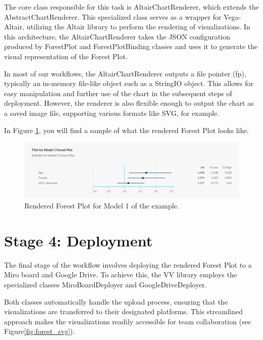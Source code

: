 The core class responsible for this task is AltairChartRenderer, which
extends the AbstractChartRenderer. This specialized class serves as a
wrapper for Vega-Altair, utilizing the Altair library to perform the
rendering of visualizations. In this architecture, the
AltairChartRenderer takes the JSON configuration produced by ForestPlot
and ForestPlotBinding classes and uses it to generate the visual
representation of the Forest Plot.

In most of our workflows, the AltairChartRenderer outputs a file pointer
(fp), typically an in-memory file-like object such as a StringIO object.
This allows for easy manipulation and further use of the chart in the
subsequent steps of deployment. However, the renderer is also flexible
enough to output the chart as a saved image file, supporting various
formats like SVG, for example.

In Figure \ref{fig:forest}, you will find a sample of what the rendered Forest Plot
looks like.

\begin{figure}[ht]
  \centering
  \includegraphics[width=\textwidth]{media/fig15.png}
  \caption{Rendered Forest Plot for Model 1 of the example.}
  \label{fig:forest}
\end{figure}

\section{Stage 4: Deployment}\label{stage-4-deployment}

The final stage of the workflow involves deploying the rendered Forest
Plot to a Miro board and Google Drive. To achieve this, the VV library
employs the specialized classes MiroBoardDeployer and
GoogleDriveDeployer.

Both classes automatically handle the upload process, ensuring that the
visualizations are transferred to their designated platforms. This
streamlined approach makes the visualizations readily accessible for
team collaboration (see Figure\ref{fig:forest_svg}).

